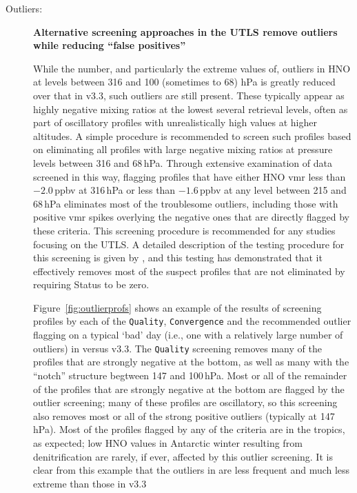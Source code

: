 \documentclass[11pt,draft]{report}
\newcommand{\screeningrule}[1]{\textbf{#1}\par}
\begin{document}
\begin{description}
\item[Outliers:] \screeningrule{Alternative screening approaches in the
    UTLS remove outliers while reducing ``false positives''}

  While the number, and particularly the extreme values of, outliers in
  \thisv HNO at levels between 316 and 100 (sometimes to 68) hPa is
  greatly reduced over that in v3.3, such outliers are still present.
  These typically appear as highly negative mixing ratios at the lowest
  several retrieval levels, often as part of oscillatory profiles with
  unrealistically high values at higher altitudes.  A simple procedure
  is recommended to screen such profiles based on eliminating all
  profiles with large negative mixing ratios at pressure levels between
  316 and 68\,hPa.  Through extensive examination of data screened in
  this way, flagging profiles that have either HNO vmr less than
  $-2.0$\,ppbv at 316\,hPa or less than $-1.6$\,ppbv at any level
  between 215 and 68\,hPa eliminates most of the troublesome outliers,
  including those with positive vmr spikes overlying the negative ones
  that are directly flagged by these criteria.  This screening procedure
  is recommended for any studies focusing on the UTLS\@. A detailed
  description of the testing procedure for this screening is given by
  \citet{EOSMLSV33V34Quality}, and this testing has demonstrated that it
  effectively removes most of the suspect profiles that are not
  eliminated by requiring Status to be zero.

  Figure~\ref{fig:outlierprofs} shows an example of the results of
  screening profiles by each of the \texttt{Quality},
  \texttt{Conver\-gence} and the recommended outlier flagging on a
  typical `bad' day (i.e., one with a relatively large number of
  outliers) in \thisv versus v3.3.  The \texttt{Quality} screening
  removes many of the profiles that are strongly negative at the bottom,
  as well as many with the ``notch'' structure begtween 147 and
  100\,hPa.  Most or all of the remainder of the profiles that are
  strongly negative at the bottom are flagged by the outlier screening;
  many of these profiles are oscillatory, so this screening also removes
  most or all of the strong positive outliers (typically at 147\,hPa).
  Most of the profiles flagged by any of the criteria are in the
  tropics, as expected; low HNO values in Antarctic winter resulting
  from denitrification are rarely, if ever, affected by this outlier
  screening. It is clear from this example that the outliers in \thisv
  are less frequent and much less extreme than those in v3.3
 
\end{description}
\end{document}
